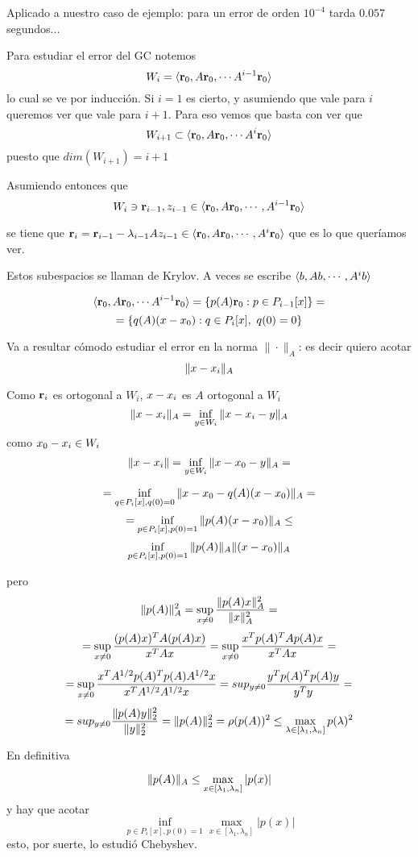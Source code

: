 Aplicado a nuestro caso de ejemplo: para un error de orden $10^{-4}$ tarda $0.057$ segundos...

Para estudiar el error del GC notemos
$$
W_i=\langle \rb_0, \Ab\rb_0, \cdots \Ab^{i-1}\rb_0\rangle
$$
lo cual se ve por inducción. Si $i=1$ es cierto, y asumiendo que vale para $i$ queremos ver que vale para $i+1$. Para eso vemos que basta con ver que 
$$
W_{i+1}\subset
\langle \rb_0, \Ab\rb_0, \cdots \Ab^{i}\rb_0\rangle
$$
puesto que $dim(W_{i+1})=i+1$

Asumiendo entonces que   
$$W_{i}\ni \rb_{i-1},\zb_{i-1}\in \langle \rb_0, \Ab\rb_0, \cdots ,\Ab^{i-1}\rb_0\rangle$$



se tiene que  $\rb_{i}=\rb_{i-1}-\lambda_{i-1}\Ab\zb_{i-1}\in \langle \rb_0, \Ab\rb_0, \cdots ,\Ab^{i}\rb_0\rangle$
que es lo que queríamos ver.


Estos subespacios se llaman de Krylov. A veces se escribe
$\langle \bb, \Ab\bb, \cdots ,\Ab^{i}\bb\rangle$


$$\langle \rb_0, \Ab\rb_0, \cdots \Ab^{i-1}\rb_0\rangle=\{ p(\Ab)\rb_0: p\in P_{i-1}[x]\}=$$
$$=\{ q(\Ab)(\xb-\xb_0): q\in P_{i}[x],\ q(0)=0\}$$

Va a resultar cómodo estudiar el error en la norma $\|\cdot\|_A$: es decir quiero acotar 
$$
\|\xb-\xb_i\|_{A}$$

Como $\mathbf{r}_i$ es ortogonal a $W_i$, $\xb-\xb_i
$ es $A$ ortogonal a $W_i$
$$
\|\xb-\xb_i\|_{A}=\inf_{\yb\in W_i}\|\xb-\xb_i-\yb\|_{A}
$$
como $\xb_0-\xb_i\in W_i$
$$
\|\xb-\xb_i\|=\inf_{\yb\in W_i}
\|\xb-\xb_0-\yb\|_{A}
=$$

$$
=\inf_{q\in P_{i}[x],q(0)=0}\|\xb-\xb_0-q(\Ab)(\xb-\xb_0)\|_{A}
=$$
$$
=\inf_{p\in P_i[x],p(0)=1}\|p(\Ab)(\xb-\xb_0)\|_{A}
\le$$
$$
\inf_{p\in P_i[x],p(0)=1}\|p(\Ab)\|_{A}\|(\xb-\xb_0)\|_{A}
$$

pero
$$
\|p(\Ab)\|_A^2=\sup_{\xb\neq\cero}\frac{\|p(\Ab)\xb\|_A^2}{\|\xb\|_A^2}=
$$
$$=\sup_{\xb\neq\cero}\frac{(p(\Ab)\xb)^T\Ab (p(\Ab)\xb)}{\xb^T\Ab\xb}=\sup_{\xb\neq\cero}\frac{\xb^T p(\Ab)^T\Ab p(\Ab)\xb}{\xb^T\Ab\xb}=
$$
$$
=\sup_{\xb\neq\cero}\frac{\xb^T\Ab^{1/2} p(\Ab)^T p(\Ab)\Ab^{1/2}\xb}{\xb^T\Ab^{1/2}\Ab^{1/2}\xb}=sup_{\yb\neq\cero}\frac{\yb^T p(\Ab)^T p(\Ab)\yb}{\yb^T\yb}
=$$
$$
=sup_{\yb\neq\cero}\frac{ \|p(\Ab)\yb\|_2^2}{\|\yb\|^2_2}
=\|p(\Ab)\|_2^2=\rho(p(\Ab))^2\le \max_{\lambda\in [\lambda_1,\lambda_n]}p(\lambda)^2$$

En definitiva

$$
\|p(\Ab)\|_A\le  \max_{x\in [\lambda_1,\lambda_n]}|p(x)| 
$$
y hay que acotar
$$
\inf_{p\in P_i[x],p(0)=1}\max_{x\in [\lambda_1,\lambda_n]}|p(x)|
$$
esto, por suerte, lo estudió Chebyshev.

